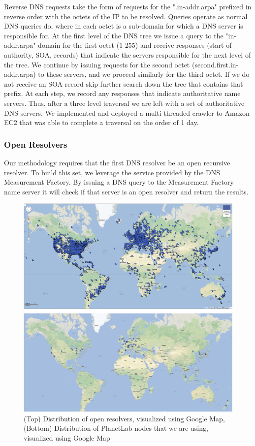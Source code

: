 Reverse DNS requests take the form of requests for the ".in-addr.arpa" prefixed in reverse order with the octets of the IP to be resolved. Queries operate as normal DNS queries do, where in each octet is a sub-domain for which a DNS server is responsible for.
At the first level of the DNS tree we issue a query to the "in-addr.arpa" domain for the first octet (1-255) and receive responses (start of authority, SOA, records) that indicate the servers responsible for the next level of the tree. We continue by issuing requests for the second octet (second.first.in-addr.arpa) to these servers, and we proceed similarly for the third octet. If we do not receive an SOA record skip further search down the tree that contains that prefix. At each step, we record any responses that indicate authoritative name servers. Thus, after a three level traversal we are left with a set of authoritative DNS servers. We implemented and deployed a multi-threaded crawler to Amazon EC2 that was able to complete a traversal on the order of 1 day.

\subsubsection{Open Resolvers}
Our methodology requires that the first DNS resolver be an open recursive resolver. To build this set, we leverage the service provided by the DNS Measurement Factory. By issuing a DNS query to the Measurement Factory name server it will check if that server is an open resolver and return the results.\cite{dnsfactory}

\begin{figure}
  \centering
  \includegraphics[width=\linewidth]{../figs/geo_viz.pdf}
  \vspace{-1em}
  \caption{(Top) Distribution of open resolvers, visualized using Google Map, (Bottom) Distribution of PlanetLab nodes that we are using, visualized using Google Map}
  \label{fig:geo_viz}
\end{figure}


